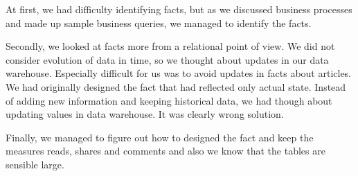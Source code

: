 At first, we had difficulty identifying facts, but as we discussed business processes and made up sample business queries, we managed to identify the facts.

Secondly, we looked at facts more from a relational point of view. We did not consider evolution
of data in time, so we thought about updates in our data warehouse. Especially difficult for us was to avoid updates in facts about articles. We had originally designed the fact that had reflected only actual state. Instead of adding new information and keeping historical data, we had though about updating values in data warehouse. It was clearly wrong solution.

Finally, we managed to figure out how to designed the fact and keep the measures reads, shares and comments and also we know that the tables are sensible large.
